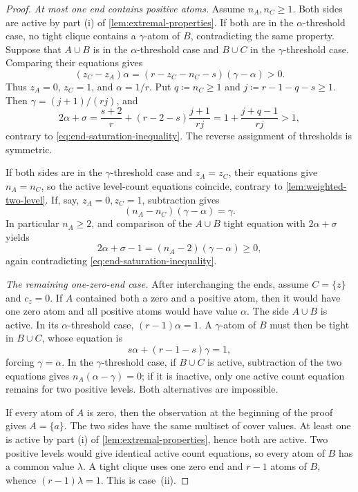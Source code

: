 \documentclass[10pt]{article}
\numberwithin{equation}{section}
\begin{document}
\begin{proof}
\smallskip
\noindent\emph{At most one end contains positive atoms.}
Assume $n_A,n_C\ge1$.  Both sides are active by part \textup{(i)} of \cref{lem:extremal-properties}.  If both are in the $\alpha$-threshold case, no tight clique contains a $\gamma$-atom of $B$, contradicting the same property.  Suppose that $A\cup B$ is in the $\alpha$-threshold case and $B\cup C$ in the $\gamma$-threshold case.  Comparing their equations gives
\[
 (z_C-z_A)\alpha
 =(r-z_C-n_C-s)(\gamma-\alpha)>0.
\]
Thus $z_A=0$, $z_C=1$, and $\alpha=1/r$.  Put $q\coloneqq n_C\ge1$ and $j\coloneqq r-1-q-s\ge1$.  Then $\gamma=(j+1)/(rj)$, and
\[
 2\alpha+\sigma
 =\frac{s+2}{r}+(r-2-s)\frac{j+1}{rj}
 =1+\frac{j+q-1}{rj}>1,
\]
contrary to \cref{eq:end-saturation-inequality}.  The reverse assignment of thresholds is symmetric.

If both sides are in the $\gamma$-threshold case and $z_A=z_C$, their equations give $n_A=n_C$, so the active level-count equations coincide, contrary to \cref{lem:weighted-two-level}.  If, say, $z_A=0,z_C=1$, subtraction gives
\[
 (n_A-n_C)(\gamma-\alpha)=\gamma.
\]
In particular $n_A\ge2$, and comparison of the $A\cup B$ tight equation with $2\alpha+\sigma$ yields
\[
 2\alpha+\sigma-1=(n_A-2)(\gamma-\alpha)\ge0,
\]
again contradicting \cref{eq:end-saturation-inequality}.

\smallskip
\noindent\emph{The remaining one-zero-end case.}
After interchanging the ends, assume $C=\{z\}$ and $c_z=0$.  If $A$ contained both a zero and a positive atom, then it would have one zero atom and all positive atoms would have value $\alpha$.  The side $A\cup B$ is active.  In its $\alpha$-threshold case, $(r-1)\alpha=1$.  A $\gamma$-atom of $B$ must then be tight in $B\cup C$, whose equation is
\[
 s\alpha+(r-1-s)\gamma=1,
\]
forcing $\gamma=\alpha$.  In the $\gamma$-threshold case, if $B\cup C$ is active, subtraction of the two equations gives $n_A(\alpha-\gamma)=0$; if it is inactive, only one active count equation remains for two positive levels.  Both alternatives are impossible.

If every atom of $A$ is zero, then the observation at the beginning of the proof gives $A=\{a\}$.  The two sides have the same multiset of cover values.  At least one is active by part \textup{(i)} of \cref{lem:extremal-properties}, hence both are active.  Two positive levels would give identical active count equations, so every atom of $B$ has a common value $\lambda$.  A tight clique uses one zero end and $r-1$ atoms of $B$, whence $(r-1)\lambda=1$.  This is case~\textup{(ii)}.


\end{proof}
\end{document}
